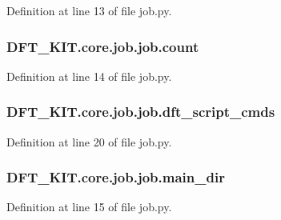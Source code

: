 Definition at line 13 of file job.\+py.

\hypertarget{class_d_f_t___k_i_t_1_1core_1_1job_1_1job_a8d327d68b516e10dbbe4e5894d575f6c}{
\subsubsection[{count}]{\setlength{\rightskip}{0pt plus 5cm}D\+F\+T\+\_\+\+K\+I\+T.\+core.\+job.\+job.\+count}}\label{class_d_f_t___k_i_t_1_1core_1_1job_1_1job_a8d327d68b516e10dbbe4e5894d575f6c}


Definition at line 14 of file job.\+py.

\hypertarget{class_d_f_t___k_i_t_1_1core_1_1job_1_1job_a29076a837f2b24097b2334d04548bed1}{
\subsubsection[{dft\+\_\+script\+\_\+cmds}]{\setlength{\rightskip}{0pt plus 5cm}D\+F\+T\+\_\+\+K\+I\+T.\+core.\+job.\+job.\+dft\+\_\+script\+\_\+cmds}}\label{class_d_f_t___k_i_t_1_1core_1_1job_1_1job_a29076a837f2b24097b2334d04548bed1}


Definition at line 20 of file job.\+py.

\hypertarget{class_d_f_t___k_i_t_1_1core_1_1job_1_1job_a9f6d722a77d028d1445a63e32aa4cb64}{
\subsubsection[{main\+\_\+dir}]{\setlength{\rightskip}{0pt plus 5cm}D\+F\+T\+\_\+\+K\+I\+T.\+core.\+job.\+job.\+main\+\_\+dir}}\label{class_d_f_t___k_i_t_1_1core_1_1job_1_1job_a9f6d722a77d028d1445a63e32aa4cb64}


Definition at line 15 of file job.\+py.

